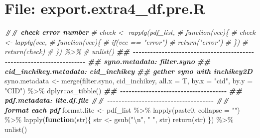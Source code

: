\documentclass[
]{article}
\newenvironment{Shaded}{\begin{snugshade}}{\end{snugshade}}
\newcommand{\AttributeTok}[1]{\textcolor[rgb]{0.77,0.63,0.00}{#1}}
\newcommand{\CommentTok}[1]{\textcolor[rgb]{0.56,0.35,0.01}{\textit{#1}}}
\newcommand{\ControlFlowTok}[1]{\textcolor[rgb]{0.13,0.29,0.53}{\textbf{#1}}}
\newcommand{\DocumentationTok}[1]{\textcolor[rgb]{0.56,0.35,0.01}{\textbf{\textit{#1}}}}
\newcommand{\FunctionTok}[1]{\textcolor[rgb]{0.00,0.00,0.00}{#1}}
\newcommand{\NormalTok}[1]{#1}
\newcommand{\OtherTok}[1]{\textcolor[rgb]{0.56,0.35,0.01}{#1}}
\newcommand{\SpecialCharTok}[1]{\textcolor[rgb]{0.00,0.00,0.00}{#1}}
\newcommand{\StringTok}[1]{\textcolor[rgb]{0.31,0.60,0.02}{#1}}
\begin{document}
\hypertarget{file-export.extra4_df.pre.r}{%
\section{File: export.extra4\_df.pre.R}\label{file-export.extra4_df.pre.r}}

\begin{Shaded}
\begin{Highlighting}[]
\DocumentationTok{\#\# check error number}
\CommentTok{\# check \textless{}{-} rapply(pdf\_list,}
                \CommentTok{\# function(vec)\{}
                \CommentTok{\#   check \textless{}{-} lapply(vec,}
                \CommentTok{\#                   function(vec)\{}
                \CommentTok{\#                     if(vec == "error")}
                \CommentTok{\#                       return("error")}
                \CommentTok{\#                   \})}
                \CommentTok{\#   return(check)}
                \CommentTok{\# \}) \%\textgreater{}\% }
  \CommentTok{\# unlist()}
\DocumentationTok{\#\# {-}{-}{-}{-}{-}{-}{-}{-}{-}{-}{-}{-}{-}{-}{-}{-}{-}{-}{-}{-}{-}{-}{-}{-}{-}{-}{-}{-}{-}{-}{-}{-}{-}{-}{-}{-}{-}{-}{-}{-}{-}{-}{-}{-}{-}{-}{-}{-}{-}{-}{-}{-}{-}{-}{-}{-}{-}{-}{-}{-}{-}{-}{-}{-}{-}{-}{-}{-}{-}{-} }
\DocumentationTok{\#\# syno.metadata: filter.syno}
\DocumentationTok{\#\# cid\_inchikey.metadata: cid\_inchikey}
\DocumentationTok{\#\# gether syno with inchikey2D}
\NormalTok{syno.metadata }\OtherTok{\textless{}{-}} \FunctionTok{merge}\NormalTok{(filter.syno, cid\_inchikey,}
                       \AttributeTok{all.x =}\NormalTok{ T, }\AttributeTok{by.x =} \StringTok{"cid"}\NormalTok{, }\AttributeTok{by.y =} \StringTok{"CID"}\NormalTok{) }\SpecialCharTok{\%\textgreater{}\%} 
\NormalTok{  dplyr}\SpecialCharTok{::}\FunctionTok{as\_tibble}\NormalTok{()}
\DocumentationTok{\#\# {-}{-}{-}{-}{-}{-}{-}{-}{-}{-}{-}{-}{-}{-}{-}{-}{-}{-}{-}{-}{-}{-}{-}{-}{-}{-}{-}{-}{-}{-}{-}{-}{-}{-}{-}{-}{-} }
\DocumentationTok{\#\# pdf.metadata: lite.df.file}
\DocumentationTok{\#\# {-}{-}{-}{-}{-}{-}{-}{-}{-}{-}{-}{-}{-}{-}{-}{-}{-}{-}{-}{-}{-}{-}{-}{-}{-}{-}{-}{-}{-}{-}{-}{-}{-}{-}{-}{-}{-} }
\DocumentationTok{\#\# format each pdf}
\NormalTok{format.lite }\OtherTok{\textless{}{-}}\NormalTok{ pdf\_list }\SpecialCharTok{\%\textgreater{}\%} 
  \FunctionTok{lapply}\NormalTok{(paste0, }\AttributeTok{collapse =} \StringTok{""}\NormalTok{) }\SpecialCharTok{\%\textgreater{}\%} 
  \FunctionTok{lapply}\NormalTok{(}\ControlFlowTok{function}\NormalTok{(str)\{}
\NormalTok{           str }\OtherTok{\textless{}{-}} \FunctionTok{gsub}\NormalTok{(}\StringTok{"}\SpecialCharTok{\textbackslash{}n}\StringTok{"}\NormalTok{, }\StringTok{" "}\NormalTok{, str)}
           \FunctionTok{return}\NormalTok{(str)}
\NormalTok{                       \}) }\SpecialCharTok{\%\textgreater{}\%} 
  \FunctionTok{unlist}\NormalTok{()}
\end{Highlighting}
\end{Shaded}
\end{document}
